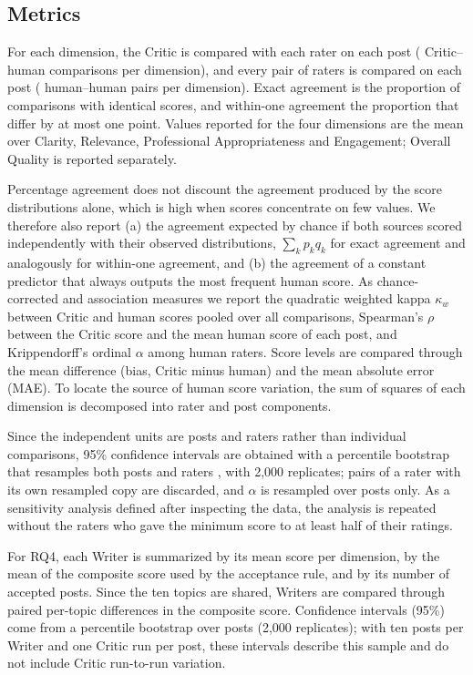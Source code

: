 \documentclass[a4paper,twoside]{article}
\begin{document}
\subsection{Metrics}
\label{sec:metrics}

For each dimension, the Critic is compared with each rater on each post (\NCHperDim{} Critic--human comparisons per dimension), and every pair of raters is compared on each post (\NHHperDim{} human--human pairs per dimension). Exact agreement is the proportion of comparisons with identical scores, and within-one agreement the proportion that differ by at most one point. Values reported for the four dimensions are the mean over Clarity, Relevance, Professional Appropriateness and Engagement; Overall Quality is reported separately.

Percentage agreement does not discount the agreement produced by the score distributions alone, which is high when scores concentrate on few values. We therefore also report (a) the agreement expected by chance if both sources scored independently with their observed distributions, $\sum_k p_k q_k$ for exact agreement and analogously for within-one agreement, and (b) the agreement of a constant predictor that always outputs the most frequent human score. As chance-corrected and association measures we report the quadratic weighted kappa $\kappa_w$ \cite{cohen1968weighted} between Critic and human scores pooled over all comparisons, Spearman's $\rho$ between the Critic score and the mean human score of each post, and Krippendorff's ordinal $\alpha$ \cite{krippendorff2018content} among human raters. Score levels are compared through the mean difference (bias, Critic minus human) and the mean absolute error (MAE). To locate the source of human score variation, the sum of squares of each dimension is decomposed into rater and post components.

Since the independent units are posts and raters rather than individual comparisons, 95\% confidence intervals are obtained with a percentile bootstrap that resamples both posts and raters \cite{efron1994bootstrap}, with 2,000 replicates; pairs of a rater with its own resampled copy are discarded, and $\alpha$ is resampled over posts only. As a sensitivity analysis defined after inspecting the data, the analysis is repeated without the \FlaggedN{} raters who gave the minimum score to at least half of their ratings.

For RQ4, each Writer is summarized by its mean score per dimension, by the mean of the composite score used by the acceptance rule, and by its number of accepted posts. Since the ten topics are shared, Writers are compared through paired per-topic differences in the composite score. Confidence intervals (95\%) come from a percentile bootstrap over posts (2,000 replicates); with ten posts per Writer and one Critic run per post, these intervals describe this sample and do not include Critic run-to-run variation.
\end{document}
